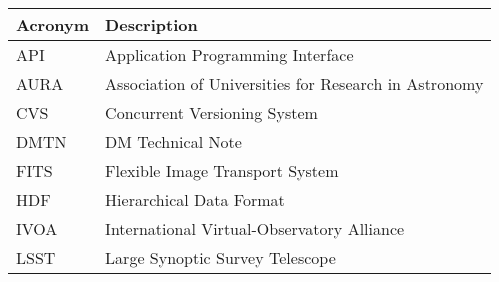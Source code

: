 \addtocounter{table}{-1}
\begin{longtable}{|l|p{}|}\hline
\textbf{Acronym} & \textbf{Description}  \\\hline

API & Application Programming Interface \\\hline
AURA & Association of Universities for Research in Astronomy \\\hline
CVS & Concurrent Versioning System \\\hline
DMTN & DM Technical Note \\\hline
FITS & Flexible Image Transport System \\\hline
HDF & Hierarchical Data Format \\\hline
IVOA & International Virtual-Observatory Alliance \\\hline
LSST & Large Synoptic Survey Telescope \\\hline
\end{longtable}
